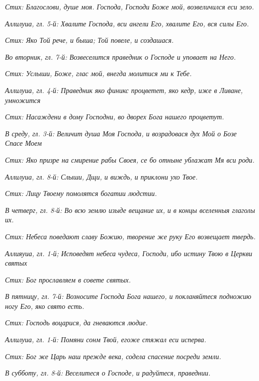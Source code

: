 \itshape Стих:\normalfont{} Благослови, душе моя. Господа, Господи Боже мой, возвеличился еси зело.


\itshape Аллилуиа, гл. 5-й:\normalfont{} Хвалите Господа, вси ангели Его, хвалите Его, вся силы Его.


\itshape Стих:\normalfont{} Яко Той рече, и быша; Той повеле, и создашася.


\itshape Во вторник, гл. 7-й:\normalfont{} Возвеселится праведник о Господе и уповает на Него.


\itshape Стих:\normalfont{} Услыши, Боже, глас мой, внегда молитися ми к Тебе.


\itshape Аллилуиа, гл. 4-й:\normalfont{} Праведник яко финикс процветет, яко кедр, иже в Ливане, умножится


\itshape Стих:\normalfont{} Насаждени в дому Господни, во дворех Бога нашего процветут.


\itshape В среду, гл. 3-й:\normalfont{} Величит душа Моя Господа, и возрадовася дух Мой о Бозе Спасе Моем


\itshape Стих:\normalfont{} Яко призре на смирение рабы Своея, се бо отныне ублажат Мя вси роди.


\itshape Аллилуиа, гл. 8-й:\normalfont{} Слыши, Дщи, и виждь, и приклони ухо Твое.


\itshape Стих:\normalfont{} Лицу Твоему помолятся богатии людстии.


\itshape В четверг, гл. 8-й:\normalfont{} Во всю землю изыде вещание их, и в концы вселенныя глаголы их.


\itshape Стих:\normalfont{} Небеса поведают славу Божию, творение же руку Его возвещает твердь.


\itshape Аллияуиа, гл. 1-й;\normalfont{} Исповедят небеса чудеса, Господи, ибо истину Твою в Церкви святых


\itshape Стих:\normalfont{} Бог прославляем в совете святых.


\itshape В пятницу, гл. 7-й:\normalfont{} Возносите Господа Бога нашего, и покланяйтеся подножию ногу Его, яко свято есть.


\itshape Стих:\normalfont{} Господь воцарися, да гневаются людие.


\itshape Аллилуиа, гл. 1-й:\normalfont{} Помяни сонм Твой, егоже стяжал еси исперва.


\itshape Стих:\normalfont{} Бог же Царь наш прежде века, содела спасение посреди земли.


\itshape В субботу, гл. 8-й:\normalfont{} Веселитеся о Господе, и радуйтеся, праведнии.


